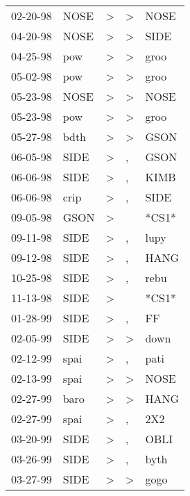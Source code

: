 \begin{supertabular}{lllll}
 02-20-98 &   NOSE &     \textgreater &     \textgreater &   NOSE \\
 04-20-98 &   NOSE &     \textgreater &     \textgreater &   SIDE \\
 04-25-98 &    pow &     \textgreater &     \textgreater &   groo \\
 05-02-98 &    pow &     \textgreater &     \textgreater &   groo \\
 05-23-98 &   NOSE &     \textgreater &     \textgreater &   NOSE \\
 05-23-98 &    pow &     \textgreater &     \textgreater &   groo \\
 05-27-98 &   bdth &     \textgreater &     \textgreater &   GSON \\
 06-05-98 &   SIDE &     \textgreater &                , &   GSON \\
 06-06-98 &   SIDE &     \textgreater &                , &   KIMB \\
 06-06-98 &   crip &     \textgreater &                , &   SIDE \\
 09-05-98 &   GSON &     \textgreater &                  &  *CS1* \\
 09-11-98 &   SIDE &     \textgreater &                , &   lupy \\
 09-12-98 &   SIDE &     \textgreater &                , &   HANG \\
 10-25-98 &   SIDE &     \textgreater &                , &   rebu \\
 11-13-98 &   SIDE &     \textgreater &                  &  *CS1* \\
 01-28-99 &   SIDE &     \textgreater &                , &     FF \\
 02-05-99 &   SIDE &     \textgreater &     \textgreater &   down \\
 02-12-99 &   spai &     \textgreater &                , &   pati \\
 02-13-99 &   spai &     \textgreater &     \textgreater &   NOSE \\
 02-27-99 &   baro &     \textgreater &     \textgreater &   HANG \\
 02-27-99 &   spai &     \textgreater &                , &    2X2 \\
 03-20-99 &   SIDE &     \textgreater &                , &   OBLI \\
 03-26-99 &   SIDE &     \textgreater &                , &   byth \\
 03-27-99 &   SIDE &     \textgreater &     \textgreater &   gogo \\

\end{supertabular}

